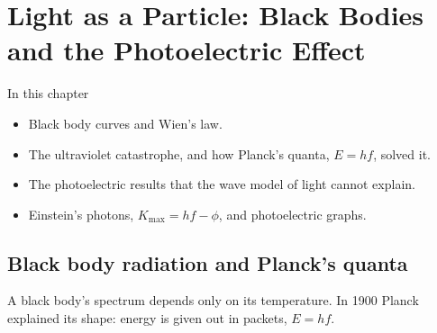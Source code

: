 \chapter{Light as a Particle: Black Bodies and the Photoelectric Effect}\label{ch3:chap}

\begin{summarybox}{In this chapter}
\begin{itemize}
  \item Black body curves and Wien's law.
  \item The ultraviolet catastrophe, and how Planck's quanta, $E = hf$, solved it.
  \item The photoelectric results that the wave model of light cannot explain.
  \item Einstein's photons, $K_\mathrm{max} = hf - \phi$, and photoelectric graphs.
\end{itemize}
\end{summarybox}

\section{Black body radiation and Planck's quanta}\label{ch3:sec:blackbody}

\begin{bigidea}
A black body's spectrum depends only on its temperature. In 1900 Planck explained its
shape: energy is given out in packets, $E = hf$.
\end{bigidea}

\begin{keywords}
\end{keywords}


